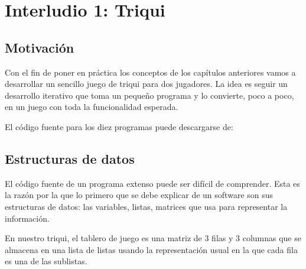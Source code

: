 


\chapter{Interludio 1: Triqui}



\section{Motivación}

Con el fin de poner en práctica los conceptos de los capítulos anteriores
vamos a desarrollar un sencillo juego de triqui para dos jugadores. La idea
es seguir un desarrollo iterativo que toma un pequeño programa y lo convierte,
poco a poco, en un juego con toda la funcionalidad esperada.

El código fuente para los diez programas puede descargarse de:


\section{Estructuras de datos}

El código fuente de un programa extenso puede ser difícil de comprender. Esta es
la razón por la que lo primero que se debe explicar de un software son sus 
estructuras de datos: las variables, listas, matrices que usa para representar
la información.

En nuestro triqui, el tablero de juego es una matriz de 3 filas y 3 columnas que
se almacena en una lista de listas usando la representación 
usual en la que cada fila es una de las sublistas.

